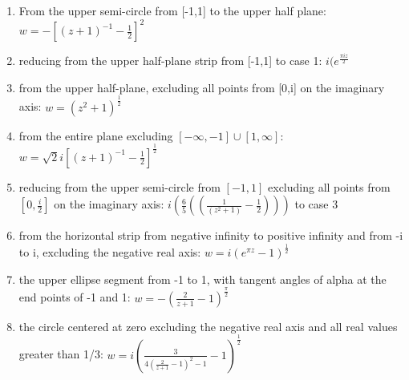 \documentclass[12pt]{article}
\theoremstyle{definition} %
\theoremstyle{plain} %
\begin{document}
   \noindent
   \begin{enumerate}
      \item From the upper semi-circle from [-1,1] to the upper half plane: $w = -\left[ (z+1)^{-1}-\frac{1}{2} \right]^{2} $
      \item reducing from the upper half-plane strip from [-1,1] to case 1: $i(e^{\frac{\pi i z}{2}}$ 
      \item from the upper half-plane, excluding all points from [0,i] on the imaginary axis: $w=(z^{2}+1)^{\frac{1}{2}}$
      \item from the entire plane excluding $\left[ -\infty, -1 \right] \cup\left[ 1,\infty  \right] $: $w=\sqrt{2}i \left[ (z+1)^{-1}- \frac{1}{2} \right]^{\frac{1}{2}}  $
      \item reducing from the upper semi-circle from $\left[ -1,1 \right] $ excluding all points from $\left[ 0, \frac{i}{2} \right] $  on the imaginary axis: $i(\frac{6}{5}((\frac{1}{(z^{2}+1)}-\frac{1}{2})))$ to case 3
      \item from the horizontal strip from negative infinity to positive infinity and from -i to i, excluding the negative real axis: $w=i(e^{\pi z}-1)^{\frac{1}{2}}$ 
      \item the upper ellipse segment from -1 to 1, with tangent angles of alpha at the end points of -1 and 1: $w = -(\frac{2}{z+1}-1)^{\frac{\pi}{2}}$ 
      \item the circle centered at zero excluding the negative real axis and all real values greater than 1/3: $w= i(\frac{3}{4(\frac{2}{z+1}-1)^{2}-1}-1)^{\frac{1}{2}}$ 
   \end{enumerate}
\end{document}

